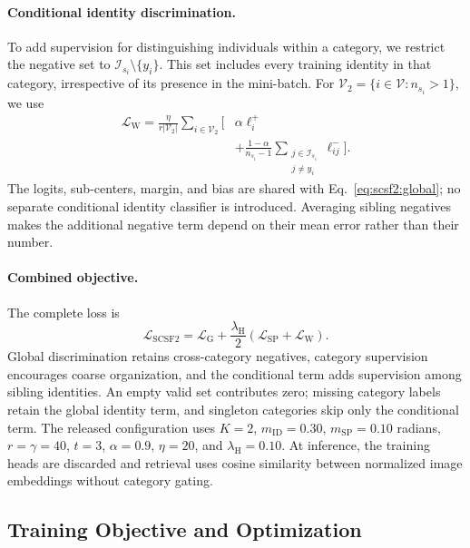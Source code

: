\paragraph{Conditional identity discrimination.}
To add supervision for distinguishing individuals within a category,
we restrict the negative set to $\mathcal{I}_{s_i}\setminus\{y_i\}$.
This set includes every training identity in that category, irrespective
of its presence in the mini-batch.
For $\mathcal{V}_2=\{i\in\mathcal{V}:n_{s_i}>1\}$, we use
\begin{equation}
\begin{split}
\mathcal{L}_{\mathrm{W}}
=\frac{\eta}{r|\mathcal{V}_2|}\sum_{i\in\mathcal{V}_2}
\Bigg[
&\alpha\ell_i^+\\[-2pt]
&+\frac{1-\alpha}{n_{s_i}-1}
\sum_{\substack{j\in\mathcal{I}_{s_i}\\j\neq y_i}}
\ell_{ij}^-
\Bigg].
\end{split}
\label{eq:scsf2:within}
\end{equation}
The logits, sub-centers, margin, and bias are shared with
Eq.~\eqref{eq:scsf2:global}; no separate conditional identity classifier
is introduced. Averaging sibling negatives makes the additional negative
term depend on their mean error rather than their number.

\paragraph{Combined objective.}
The complete loss is
\begin{equation}
\boxed{
\mathcal{L}_{\mathrm{SCSF2}}
=\mathcal{L}_{\mathrm{G}}
+\frac{\lambda_{\mathrm{H}}}{2}
\left(\mathcal{L}_{\mathrm{SP}}+\mathcal{L}_{\mathrm{W}}\right).
}
\label{eq:scsf2:total}
\end{equation}
Global discrimination retains cross-category negatives, category
supervision encourages coarse organization, and the conditional term adds
supervision among sibling identities.
An empty valid set contributes zero; missing category labels retain the
global identity term, and singleton categories skip only the conditional
term. The released configuration uses $K=2$, $m_{\mathrm{ID}}=0.30$,
$m_{\mathrm{SP}}=0.10$ radians, $r=\gamma=40$, $t=3$, $\alpha=0.9$,
$\eta=20$, and $\lambda_{\mathrm{H}}=0.10$.
At inference, the training heads are discarded and retrieval uses cosine
similarity between normalized image embeddings without category gating.


\subsection{Training Objective and Optimization}
\label{sec:method:training}

